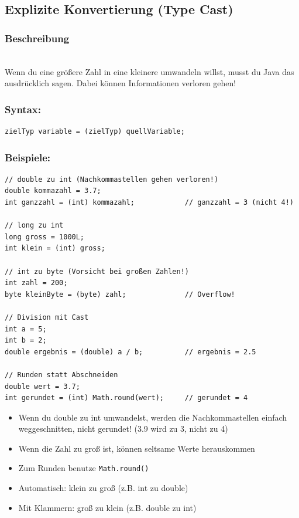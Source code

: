 \subsection*{Explizite Konvertierung (Type Cast)}

\subsubsection*{Beschreibung}\\
Wenn du eine größere Zahl in eine kleinere umwandeln willst, musst du Java das ausdrücklich sagen.
Dabei können Informationen verloren gehen!

\subsubsection*{Syntax:}
\begin{lstlisting}
zielTyp variable = (zielTyp) quellVariable;
\end{lstlisting}

\subsubsection*{Beispiele:}
\begin{lstlisting}
// double zu int (Nachkommastellen gehen verloren!)
double kommazahl = 3.7;
int ganzzahl = (int) kommazahl;            // ganzzahl = 3 (nicht 4!)

// long zu int
long gross = 1000L;
int klein = (int) gross;

// int zu byte (Vorsicht bei großen Zahlen!)
int zahl = 200;
byte kleinByte = (byte) zahl;              // Overflow!

// Division mit Cast
int a = 5;
int b = 2;
double ergebnis = (double) a / b;          // ergebnis = 2.5

// Runden statt Abschneiden
double wert = 3.7;
int gerundet = (int) Math.round(wert);     // gerundet = 4
\end{lstlisting}

\begin{achtung}
	\begin{itemize}
		\item Wenn du double zu int umwandelst, werden die Nachkommastellen einfach weggeschnitten, nicht gerundet! (3.9 wird zu 3, nicht zu 4)
		\item Wenn die Zahl zu groß ist, können seltsame Werte herauskommen
		\item Zum Runden benutze \texttt{Math.round()}
		\item Automatisch: klein zu groß (z.B. int zu double)
		\item Mit Klammern: groß zu klein (z.B. double zu int)
	\end{itemize}
\end{achtung}

